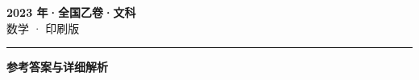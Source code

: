 \documentclass[zihao=5, a4paper]{ctexart}
\begin{document}
\begin{center}
  {\Large\bfseries 2023 年·全国乙卷·文科}\\[4pt]
  {\large 数学 · 印刷版}
\end{center}
\medskip
{}

\par\bigskip\hrule\bigskip
{}
\begin{center}{\large\bfseries 参考答案与详细解析}\end{center}
\smallskip

\end{document}
